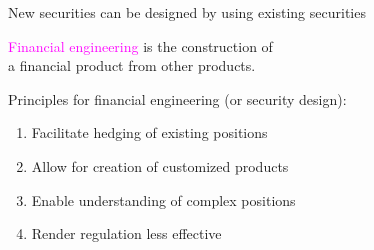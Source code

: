 \begin{frame}[fragile,t]
	\begin{center}
		New securities can be designed by using existing securities
		\bigskip

		\textcolor{magenta}{Financial engineering} is the construction of \\
		a financial product from other products.

		\pause \bigskip \mySeparateLine \bigskip

		Principles for financial engineering (or security design):

		\bigskip

		\begin{minipage}{0.7\textwidth}
		\begin{enumerate}
			\item Facilitate hedging of existing positions
			\item Allow for creation of customized products
			\item Enable understanding of complex positions
			\item Render regulation less effective
		\end{enumerate}
		\end{minipage}
	\end{center}
\end{frame}

